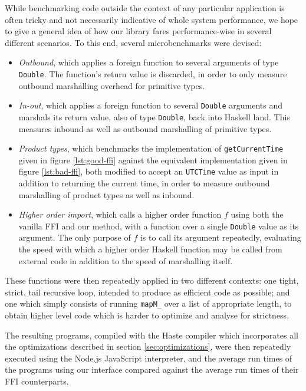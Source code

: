 \documentclass[preprint]{sigplanconf}
\begin{document}
While benchmarking code outside the context of any particular application is
often tricky and not necessarily indicative of whole system performance,
we hope to give a general idea of how our library fares performance-wise in
several different scenarios.
To this end, several microbenchmarks were devised:

\begin{itemize}
\item
  \emph{Outbound}, which applies a foreign function to several arguments of
  type \lstinline!Double!. The function's return value is discarded, in order
  to only measure outbound marshalling overhead for primitive types.
\item
  \emph{In-out}, which applies a foreign function to several \lstinline!Double!
  arguments and marshals its return value, also of type \lstinline!Double!,
  back into Haskell land. This measures inbound as well as outbound marshalling
  of primitive types.
\item
  \emph{Product types}, which benchmarks the implementation of\linebreak
  \lstinline!getCurrentTime! given in figure \ref{lst:good-ffi} against
  the equivalent implementation given in figure \ref{lst:bad-ffi}, both
  modified to accept an \lstinline!UTCTime! value as input in addition to
  returning the current time, in order to measure outbound marshalling of
  product types as well as inbound.
\item
  \emph{Higher order import}, which calls a higher order function $f$ using
  both the vanilla FFI and our method, with a function over a
  single \lstinline!Double! value as its argument.
  The only purpose of $f$ is to call its argument repeatedly,
  evaluating the speed with which a higher order Haskell function may be called
  from external code in addition to the speed of marshalling itself.
\end{itemize}

These functions were then repeatedly applied in two different contexts: one
tight, strict, tail recursive loop, intended to produce as efficient code
as possible; and one which simply consists of running \lstinline!mapM_! over
a list of appropriate length, to obtain higher level code which is harder to
optimize and analyse for strictness.

The resulting programs, compiled with the Haste compiler which incorporates all
the optimizations described in section \ref{sec:optimizations},
were then repeatedly executed using the Node.js JavaScript interpreter,
and the average run times of the programs using our interface compared against
the average run times of their FFI counterparts.
\end{document}
